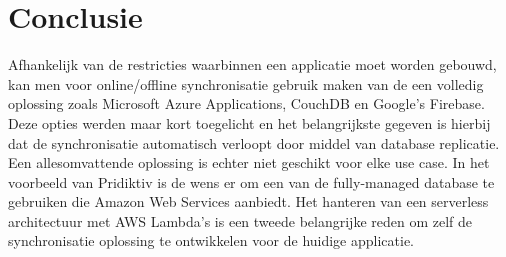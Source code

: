 
\chapter{Conclusie}
\label{ch:conclusie}


Afhankelijk van de restricties waarbinnen een applicatie moet worden gebouwd, kan men voor online/offline synchronisatie gebruik maken van de een volledig oplossing zoals Microsoft Azure Applications, CouchDB en Google's Firebase. Deze opties werden maar kort toegelicht en het belangrijkste gegeven is hierbij dat de synchronisatie automatisch verloopt door middel van database replicatie. Een allesomvattende oplossing is echter niet geschikt voor elke use case. In het voorbeeld van Pridiktiv is de wens er om een van de fully-managed database te gebruiken die Amazon Web Services aanbiedt. Het hanteren van een serverless architectuur met AWS Lambda's is een tweede belangrijke reden om zelf de synchronisatie oplossing te ontwikkelen voor de huidige applicatie.

